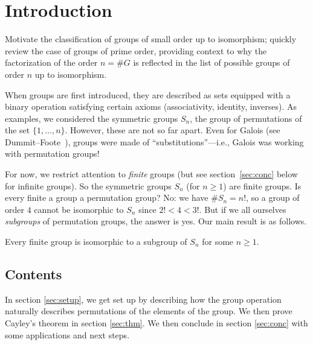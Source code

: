 \section{Introduction}\label{sec:intro}

\begin{Answer}
  Motivate the classification of groups of small order up to isomorphism; 
  quickly review the case of groups of prime order, providing context to why the 
  factorization of the order $n=\#G$ is reflected in the list of possible groups of 
  order $n$ up to isomorphism.
\end{Answer}

When groups are first introduced, they are described as sets equipped with a binary operation
satisfying certain axioms (associativity, identity, inverses).
As examples, we considered the symmetric groups $S_n$, the group of permutations of the set
$\{1,\dots,n\}$.  However, these are not so far apart.  Even for Galois (see 
Dummit--Foote~\cite[p.~14 (3)]{DummitFoote}), groups were made of ``substitutions''---i.e., 
Galois was working with permutation groups!  

For now, we restrict attention to \emph{finite} groups (but see section~\ref{sec:conc} below 
for infinite groups).  So the symmetric groups $S_n$ (for $n \geq 1$) are finite groups.  Is 
every finite a group a permutation group?  No: we have $\#S_n=n!$, so a group of order $4$ 
cannot be isomorphic to $S_n$ since $2! < 4 < 3!$.  But if we all ourselves \emph{subgroups} 
of permutation groups, the answer is yes.  Our main result is as follows.

\begin{thm}[Cayley] \label{thm:cayley}
Every finite group is isomorphic to a subgroup of $S_n$ for some $n \geq 1$.
\end{thm}

\subsection*{Contents} In section \ref{sec:setup}, we get set up by describing how the group 
operation naturally describes permutations of the elements of the group.  We then prove 
Cayley's theorem in section \ref{sec:thm}.  We then conclude in section \ref{sec:conc} with 
some applications and next steps.
